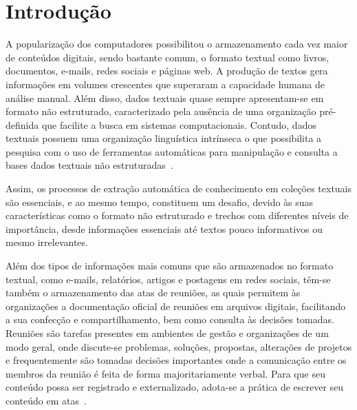 \chapter{Introdução}\label{cap1}

\let\cleardoublepage\clearpage


A popularização dos computadores possibilitou o armazenamento cada vez maior de conteúdos digitais, sendo bastante comum, o formato textual como livros, documentos, e-mails, redes sociais e páginas web. A produção de textos gera informações em volumes crescentes que superaram a capacidade humana de análise manual.  %
%
Além disso, dados textuais quase sempre apresentam-se em formato não estruturado, caracterizado pela ausência de uma organização pré-definida que facilite a busca em sistemas computacionais.
%
Contudo, dados textuais possuem uma organização linguística intrínseca o que possibilita a pesquisa com o uso de ferramentas automáticas para manipulação e consulta a bases dados textuais não estruturadas~\cite{Cao:2017, Manning2008}. 



Assim, os processos de extração automática de conhecimento em coleções textuais são essenciais, e ao mesmo tempo, constituem um desafio, devido às suas características como o formato não estruturado e trechos com diferentes níveis de importância, desde informações essenciais até textos pouco informativos ou mesmo irrelevantes. 

Além dos tipos de informações mais comuns que são armazenados no formato textual, como e-mails, relatórios, artigos e postagens em redes sociais, têm-se também o armazenamento das atas de reuniões, as quais permitem às organizações a documentação oficial de reuniões em arquivos digitais, facilitando a sua confecção e compartilhamento, bem como consulta às decisões tomadas.
% 
% 
% 
Reuniões são tarefas presentes em ambientes de gestão e organizações de um modo geral, onde discute-se problemas, soluções, propostas, alterações de projetos e frequentemente são tomadas decisões importantes onde a comunicação entre os membros da reunião é feita de forma majoritariamente verbal. Para que seu conteúdo possa ser registrado e externalizado, adota-se a prática de escrever seu conteúdo em atas~\cite{Miriam2013, Lee2011}.

